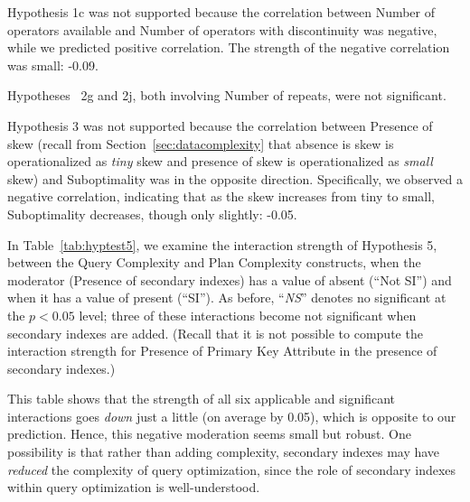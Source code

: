 \documentclass[prodmode,acmtods]{acmsmall}
\begin{document}
Hypothesis 1c was not supported because the
correlation between Number of operators available and Number of operators
with discontinuity was negative, while we predicted positive
correlation. The strength of the negative correlation was small: \hbox{-0.09}.

Hypotheses ~2g and 2j, both involving Number of repeats, were not significant.

Hypothesis 3 was
not supported because the correlation between Presence of skew (recall from
Section~\ref{sec:datacomplexity} that absence is skew is operationalized as
{\em tiny} skew and presence of skew is operationalized as {\em small} skew)
and Suboptimality was in the opposite direction. Specifically, we observed a negative correlation,
indicating that as the skew increases from tiny to small, Suboptimality
decreases, though only slightly: \hbox{-0.05}.

In Table~\ref{tab:hyptest5}, we examine the interaction strength of
Hypothesis 5, between the Query Complexity and Plan Complexity constructs, when
the moderator (Presence of secondary indexes) has a value of absent (``Not
SI'') and when it has a value of present
(``SI''). As before, ``{\em NS}'' denotes no significant at the $p < 0.05$
level; three of these interactions become not significant when secondary
indexes are added. (Recall that it is not possible to compute the
interaction strength for Presence of Primary Key Attribute in the presence
of secondary indexes.)

This table shows that the strength of all six applicable and significant
interactions goes {\em down} just a little (on average by 0.05), which is
opposite to our prediction. Hence, this negative moderation seems small but
robust. One possibility is that rather than adding
complexity, secondary indexes may have {\em reduced} the complexity of query
optimization, since the role of secondary indexes within query optimization
is well-understood.
\end{document}
